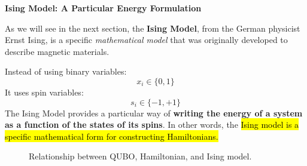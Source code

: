 \highspace
\begin{flushleft}
    \textcolor{Green3}{ \textbf{Ising Model: A Particular Energy Formulation}}
\end{flushleft}
As we will see in the next section, the \textbf{Ising Model}, from the German physicist Ernst Ising, is a specific \emph{mathematical model} that was originally developed to describe magnetic materials.

\highspace
Instead of using binary variables:
\begin{equation*}
    x_{i} \in \{0, 1\}
\end{equation*}
It uses spin variables:
\begin{equation*}
    s_{i} \in \{-1, +1\}
\end{equation*}
The Ising Model provides a particular way of \textbf{writing the energy of a system as a function of the states of its spins}. In other words, the \hl{Ising model is a specific mathematical form for constructing Hamiltonians.}

\highspace
\begin{figure}[!htp]
    \centering
    \caption{Relationship between QUBO, Hamiltonian, and Ising model.}
\end{figure}

